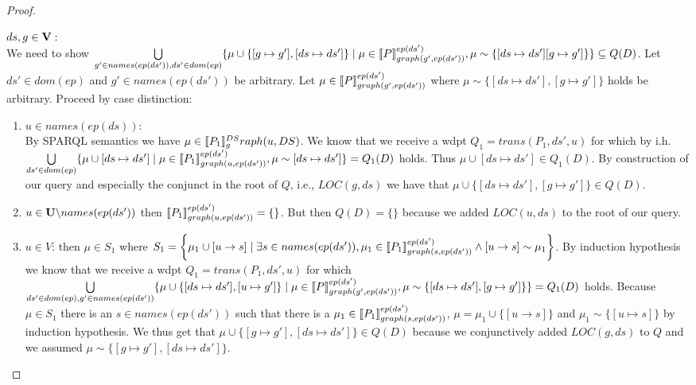 \begin{proof}
\begin{enumerate}
			\bigskip\noindent
			$ds,g \in \mathbf{V}:$ \\
			We need to show 
			$\bigcup\limits_{g' \in names(ep(ds')), ds' \in dom(ep)} \{ \mu \cup
				\{[g \mapsto g'],[ds \mapsto ds']\} \mid \mu \in
				\llbracket P\rrbracket^{ep(ds')}_{graph(g',ep(ds'))}, \mu \sim
			\{[ds \mapsto ds'][g\mapsto g']\} \}  \subseteq Q(D) $.
			Let  $ds' \in dom(ep)$ and $g' \in names(ep(ds'))$ be arbitrary.
			Let $\mu \in \llbracket P \rrbracket^{ep(ds')}_{graph(g',ep(ds'))}$ where $\mu
			\sim\{[ds\mapsto ds'], [g\mapsto g'] \}$ holds be arbitrary.
			Proceed by case distinction:
			\begin{enumerate}
				\item $u \in names(ep(ds))$:\\
					By SPARQL semantics we have $\mu \in \llbracket P_1
					\rrbracket^{DS}_graph(u,DS)$.
					We know that we receive a wdpt $Q_1	= trans(P_1,ds',u)$ 
					for which by i.h.
					$\bigcup\limits_{ds' \in dom(ep)} \{ \mu \cup [ds \mapsto ds'] \mid \mu \in
						\llbracket P_1\rrbracket^{ep(ds')}_{graph(u,ep(ds'))}, \mu \sim
					[ds\mapsto ds'] \}  = Q_1(D) $
					holds. Thus $\mu \cup [ds \mapsto ds'] \in Q_1(D)$.
					By construction of our query and especially the conjunct in the
					root of $Q$, i.e., $LOC(g,ds)$ we have that $\mu \cup
					\{[ds\mapsto ds'],[g \mapsto g']\} \in Q(D)$.

				\item $u \in \mathbf{U} \backslash names(ep(ds'))$
					then $\llbracket P_1 \rrbracket^{ep(ds')}_{graph(u,ep(ds'))} = \{\}$. But then
					$Q(D) = \{\}$ because we added $LOC(u,ds)$ to the root of
					our query. 

				\item $u \in V$:
					then $\mu \in S_1$ where $S_1 =  \bigg\{\mu_1 \cup [ u \rightarrow s ]
						\mid \exists s \in names(ep(ds')),\\ \mu_1 \in \llbracket P_1
						\rrbracket^{ep(ds')}_{graph(s,ep(ds'))} \land [ u \rightarrow s ] \sim
					\mu_1 \bigg\}$. 
					By induction hypothesis we know that we receive a wdpt $Q_1
					= trans(P_1,ds',u)$ for which \\
					$\bigcup\limits_{ds' \in dom(ep), g' \in names(ep(ds'))} \{ \mu
						\cup \{[ds \mapsto ds'],[u \mapsto g']\} \mid \\ \mu \in
						\llbracket P\rrbracket^{ep(ds')}_{graph(g',ep(ds'))}, 
					\mu \sim \{[ds\mapsto ds'], [g \mapsto g']\}\} = Q_1(D) $
					holds. Because $\mu \in S_1$ there
					is an $s \in names(ep(ds'))$ such  that there is a $\mu_1 \in \llbracket P_1
					\rrbracket^{ep(ds')}_{graph(s,ep(ds'))}$, $\mu = \mu_1 \cup \{[u \rightarrow
					s]\}$ and  $\mu_1 \sim \{[u \mapsto s]\}$ by induction hypothesis. 
					We thus get that $\mu\cup \{[g\mapsto g'],[ds \mapsto ds']\} \in Q(D)$ because we
					conjunctively added $LOC(g,ds)$ to $Q$ and we assumed $\mu
					\sim \{[g\mapsto g'],[ds \mapsto ds']\}$.
			\end{enumerate}


\end{enumerate}
\end{proof}
